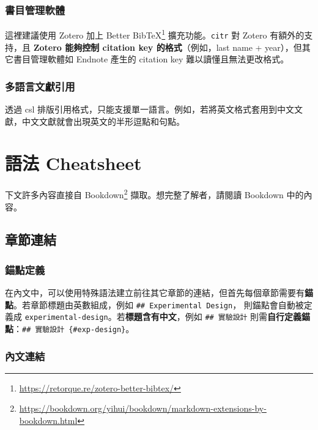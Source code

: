 \documentclass[oneside]{book}
\renewcommand{\href}[2]{#2\footnote{\url{#1}}}
\begin{document}
\hypertarget{ref-manager}{%
\subsection{書目管理軟體}\label{ref-manager}}

這裡建議使用 Zotero 加上 \href{https://retorque.re/zotero-better-bibtex/}{Better BibTeX} 擴充功能。\texttt{citr} 對 Zotero 有額外的支持，且 \textbf{Zotero 能夠控制 citation key 的格式}（例如，last name + year），但其它書目管理軟體如 Endnote 產生的 citation key 難以讀懂且無法更改格式。

\hypertarget{multi-lang-cite}{%
\subsection{多語言文獻引用}\label{multi-lang-cite}}

透過 csl 排版引用格式，只能支援單一語言。例如，若將英文格式套用到中文文獻，中文文獻就會出現英文的半形逗點和句點。

\hypertarget{cheatsheet}{%
\chapter{語法 Cheatsheet}\label{cheatsheet}}

下文許多內容直接自 \href{https://bookdown.org/yihui/bookdown/markdown-extensions-by-bookdown.html}{Bookdown} 擷取。想完整了解者，請閱讀 Bookdown 中的內容。

\hypertarget{chapter-cross-ref}{%
\section{章節連結}\label{chapter-cross-ref}}

\hypertarget{define-anchor}{%
\subsection{錨點定義}\label{define-anchor}}

在內文中，可以使用特殊語法建立前往其它章節的連結，但首先每個章節需要有\textbf{錨點}。若章節標題由英數組成，例如 \texttt{\#\#\ Experimental\ Design}， 則錨點會自動被定義成 \texttt{experimental-design}。若\textbf{標題含有中文}，例如 \texttt{\#\#\ 實驗設計} 則需\textbf{自行定義錨點}：\texttt{\#\#\ 實驗設計\ \{\#exp-design\}}。

\subsection{內文連結}
\end{document}
